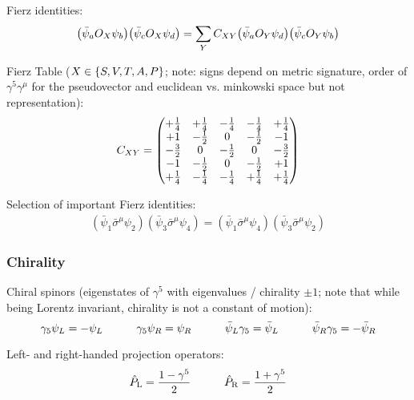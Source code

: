 			\noindent
			Fierz identities:
			\begin{equation}
				\qty(\bar{\psi}_a O_X \psi_b) \qty(\bar{\psi}_c O_X \psi_d)
				= \sum_Y C_{XY} \qty(\bar{\psi}_a O_Y \psi_d) \qty(\bar{\psi}_c O_Y \psi_b)
			\end{equation}

			\noindent
			Fierz Table ($X\in\qty{S,V,T,A,P}$; note: signs depend on metric signature, order of $\gamma^5 \gamma^\mu$ for the pseudovector and euclidean vs. minkowski space but not representation):
			\begin{equation}
				C_{XY} = \mqty(
				+\frac{1}{4} & +\frac{1}{4} & -\frac{1}{4} & -\frac{1}{4} & +\frac{1}{4} \\
				+1 & -\frac{1}{2} & 0 & -\frac{1}{2} & -1 \\
				-\frac{3}{2} & 0 & -\frac{1}{2} & 0 & -\frac{3}{2} \\
				-1 & -\frac{1}{2} & 0 & -\frac{1}{2} & +1 \\
				+\frac{1}{4} & -\frac{1}{4} & -\frac{1}{4} & +\frac{1}{4} & +\frac{1}{4} \\
				)
			\end{equation}

			\noindent
			Selection of important Fierz identities:
			\begin{align}
				(\bar{\psi}_1 \bar{\sigma}^\mu \psi_2) (\bar{\psi}_3 \bar{\sigma}^\mu \psi_4) = (\bar{\psi}_1 \bar{\sigma}^\mu \psi_4) (\bar{\psi}_3 \bar{\sigma}^\mu \psi_2)
			\end{align}

		\subsubsection{Chirality}
			\noindent
			Chiral spinors (eigenstates of $\gamma^5$ with eigenvalues / chirality $\pm 1$; note that while being Lorentz invariant, chirality is not a constant of motion):
			\begin{equation}
				\gamma_5 \psi_L = - \psi_L
				\hspace{30pt} \gamma_5 \psi_R = \psi_R
				\hspace{30pt} \bar{\psi}_L \gamma_5 = \bar{\psi}_L
				\hspace{30pt} \bar{\psi}_R \gamma_5 = -\bar{\psi}_R
			\end{equation}

			\noindent
			Left- and right-handed projection operators:
			\begin{equation}
				\label{Eq:SpinorProjectionOperators}
				\hat{P}_{\mathrm{L}}=\frac{1-\gamma^{5}}{2} \hspace{30pt}
				\hat{P}_{\mathrm{R}}=\frac{1+\gamma^{5}}{2}
			\end{equation}

